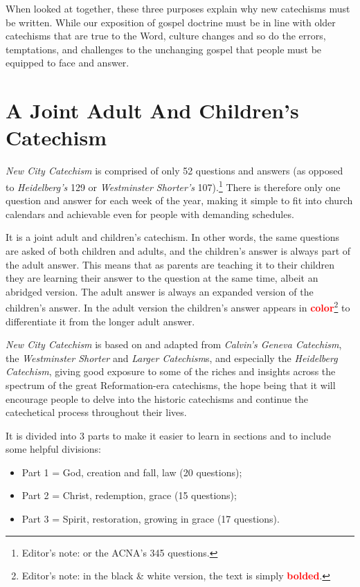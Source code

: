 \documentclass[]{memoir}
\newcommand\Children[1]{\textbf{\textcolor{red}{#1}}}
\begin{document}
When looked at together, these three purposes explain why new catechisms must be written. While our exposition of gospel doctrine must be in line with older catechisms that are true to the Word, culture changes and so do the errors, temptations, and challenges to the unchanging gospel that people must be equipped to face and answer.

\section{A Joint Adult And Children's Catechism}
\emph{New City Catechism}\/ is comprised of only 52 questions and answers (as opposed to \emph{Heidelberg's}\/ 129 or \emph{Westminster Shorter's}\/ 107).\footnote{Editor's note: or the ACNA's 345 questions.} There is therefore only one question and answer for each week of the year, making it simple to fit into church calendars and achievable even for people with demanding schedules.

It is a joint adult and children's catechism. In other words, the same questions are asked of both children and adults, and the children's answer is always part of the adult answer. This means that as parents are teaching it to their children they are learning their answer to the question at the same time, albeit an abridged version. The adult answer is always an expanded version of the children's answer. In the adult version the children's answer appears in \Children{color}\footnote{Editor's note: in the black \& white version, the text is simply \Children{bolded}.} to differentiate it from the longer adult answer.

\emph{New City Catechism}\/ is based on and adapted from \emph{Calvin's Geneva Catechism}, the \emph{Westminster Shorter}\/ and \emph{Larger Catechism}s, and especially the \emph{Heidelberg Catechism}, giving good exposure to some of the riches and insights across the spectrum of the great Reformation-era catechisms, the hope being that it will encourage people to delve into the historic catechisms and continue the catechetical process throughout their lives.

It is divided into 3 parts to make it easier to learn in sections and to include some helpful divisions:
\begin{itemize}
	\item Part 1 = God, creation and fall, law (20 questions);
	\item Part 2 = Christ, redemption, grace (15 questions);
	\item Part 3 = Spirit, restoration, growing in grace (17 questions).
\end{itemize}
\end{document}

